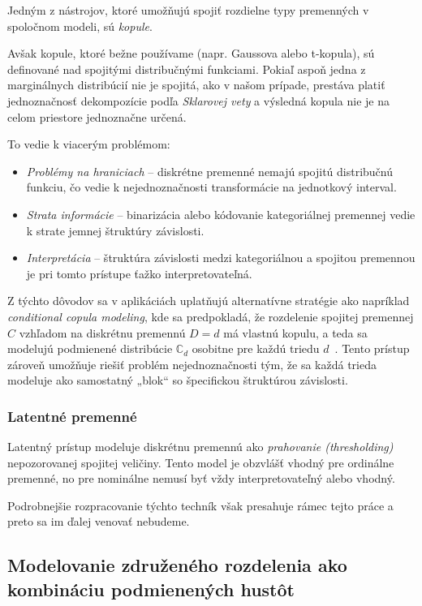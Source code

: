 Jedným z nástrojov, ktoré umožňujú spojiť rozdielne typy premenných v spoločnom modeli, sú \textit{kopule}.

Avšak kopule, ktoré bežne používame (napr. Gaussova alebo t-kopula), sú definované nad spojitými distribučnými funkciami. Pokiaľ aspoň jedna z marginálnych distribúcií nie je spojitá, ako v našom prípade, prestáva platiť jednoznačnosť dekompozície podľa \textit{Sklarovej vety} a výsledná kopula nie je na celom priestore jednoznačne určená.

To vedie k viacerým problémom:
\begin{itemize}
  \item \textit{Problémy na hraniciach} – diskrétne premenné nemajú spojitú distribučnú funkciu, čo vedie k nejednoznačnosti transformácie na jednotkový interval.
  \item \textit{Strata informácie} – binarizácia alebo kódovanie kategoriálnej premennej vedie k strate jemnej štruktúry závislosti.
  \item \textit{Interpretácia} – štruktúra závislosti medzi kategoriálnou a spojitou premennou je pri tomto prístupe ťažko interpretovateľná.
\end{itemize}

Z týchto dôvodov sa v aplikáciách uplatňujú alternatívne stratégie ako napríklad \textit{conditional copula modeling}, kde sa predpokladá, že rozdelenie spojitej premennej $C$ vzhľadom na diskrétnu premennú $D = d$ má vlastnú kopulu, a teda sa modelujú podmienené distribúcie $\mathbb{C}_d$ osobitne pre každú triedu $d$~\parencite{pleisMixtureDissertation}. Tento prístup zároveň umožňuje riešiť problém nejednoznačnosti tým, že sa každá trieda modeluje ako samostatný „blok“ so špecifickou štruktúrou závislosti.

\subsubsection{Latentné premenné}\label{latent_vars}

Latentný prístup modeluje diskrétnu premennú ako \textit{prahovanie (thresholding)} nepozorovanej spojitej veličiny. Tento model je obzvlášť vhodný pre ordinálne premenné, no pre nominálne nemusí byť vždy interpretovateľný alebo vhodný.

Podrobnejšie rozpracovanie týchto techník však presahuje rámec tejto práce a preto sa im ďalej venovať nebudeme.

\subsection{Modelovanie združeného rozdelenia ako kombináciu podmienených hustôt}\label{subsec:glom_joint_mixture}

